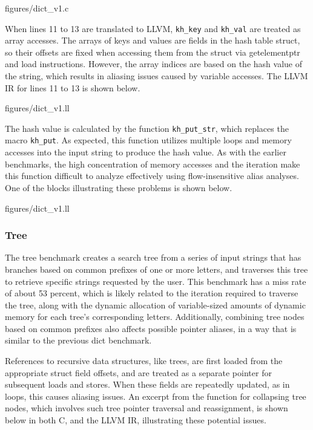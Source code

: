  {figures/dict_v1.c}

When lines 11 to 13 are translated to LLVM, \texttt{kh\_key} and \texttt{kh\_val} are treated as array accesses. The arrays of keys and values are fields in the hash table struct, so their offsets are fixed when accessing them from the struct via getelementptr and load instructions. However, the array indices are based on the hash value of the string, which results in aliasing issues caused by variable accesses. The LLVM IR for lines 11 to 13 is shown below.

 {figures/dict_v1.ll}

The hash value is calculated by the function \texttt{kh\_put\_str}, which replaces the macro \texttt{kh\_put}. As expected, this function utilizes multiple loops and memory accesses into the input string to produce the hash value. As with the earlier benchmarks, the high concentration of memory accesses and the iteration make this function difficult to analyze effectively using flow-insensitive alias analyses. One of the blocks illustrating these problems is shown below.

 {figures/dict_v1.ll}

\subsubsection{Tree}
The tree benchmark creates a search tree from a series of input strings that has branches based on common prefixes of one or more letters, and traverses this tree to retrieve specific strings requested by the user. This benchmark has a miss rate of about 53 percent, which is likely related to the iteration required to traverse the tree, along with the dynamic allocation of variable-sized amounts of dynamic memory for each tree's corresponding letters. Additionally, combining tree nodes based on common prefixes also affects possible pointer aliases, in a way that is similar to the previous dict benchmark.

References to recursive data structures, like trees, are first loaded from the appropriate struct field offsets, and are treated as a separate pointer for subsequent loads and stores. When these fields are repeatedly updated, as in loops, this causes aliasing issues. An excerpt from the function for collapsing tree nodes, which involves such tree pointer traversal and reassignment, is shown below in both C, and the LLVM IR, illustrating these potential issues.

